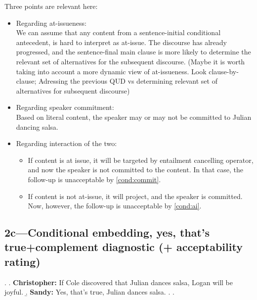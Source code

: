 \documentclass[11pt]{article}
\begin{document}
		Three points are relevant here:
		\begin{itemize}
			\item Regarding at-issueness:\\
				We can assume that any content from a sentence-initial conditional antecedent, is hard to interpret as at-issue. The discourse has already progressed, and the sentence-final main clause is more likely to determine the relevant set of alternatives for the subsequent discourse. (Maybe it is worth taking into account a more dynamic view of at-issueness. Look clause-by-clause; Adressing the previous QUD vs determining relevant set of alternatives for subsequent discourse)
			\item Regarding speaker commitment:\\
				Based on literal content, the speaker may or may not be committed to Julian dancing salsa.
			\item Regarding interaction of the two:
			\begin{itemize}
				\item If content is at issue, it will be targeted by entailment cancelling operator, and now the speaker is not committed to the content. In that case, the follow-up is unacceptable by \ref{cond:commit}.
				\item If content is not at-issue, it will project, and the speaker is committed. Now, however, the follow-up is unacceptable by \ref{cond:ai}.
			\end{itemize}
				
		\end{itemize}
	

	\subsection{2c---Conditional embedding,  yes, that's true+complement diagnostic (+ acceptability rating)} 
		\ex. \a. \textbf{Christopher:} If Cole discovered that Julian dances salsa, Logan will be joyful.
			\b. \textbf{Sandy:} Yes, that’s true, Julian dances salsa.
			\z.
		\z.
\end{document}
